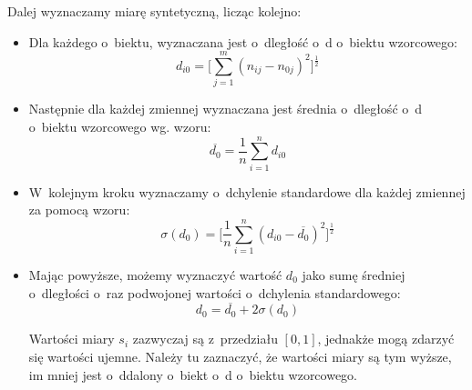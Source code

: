 \documentclass[12pt,a4paper]{report}
\begin{document}
Dalej wyznaczamy miarę syntetyczną, licząc kolejno:
\begin{itemize}
\item Dla każdego o~biektu, wyznaczana jest o~dległość o~d o~biektu wzorcowego:
$$d_{i0}=\bigg[\sum_{j=1}^{m} (n_{ij} - n_{0j})^2 \bigg]^\frac{1}{2}  $$ 
\item Następnie dla każdej zmiennej wyznaczana jest średnia o~dległość o~d o~biektu wzorcowego wg. wzoru:
$$\overline{d_{0}}=\frac{1}{n}\sum_{i=1}^{n} d_{i0} $$
\item W~kolejnym kroku wyznaczamy o~dchylenie standardowe dla każdej zmiennej za pomocą wzoru: 
$$\sigma(d_{0})=\bigg[\frac{1}{n}\sum_{i=1}^{n} (d_{i0}-\overline{d_{0}})^2 \bigg]^\frac{1}{2} $$
\item Mając powyższe, możemy wyznaczyć wartość $d_{0}$ jako sumę średniej o~dległości o~raz podwojonej wartości o~dchylenia standardowego:
$$d_{0}=\overline{d_{0}} + 2\sigma(d_{0}) $$


Wartości miary $s_{i}$ zazwyczaj są z~przedziału $[0, 1]$, jednakże mogą zdarzyć się wartości ujemne. Należy tu zaznaczyć, że wartości miary są tym wyższe, im mniej jest o~ddalony o~biekt o~d o~biektu wzorcowego. 

\end{itemize}
%
%
\end{document}
